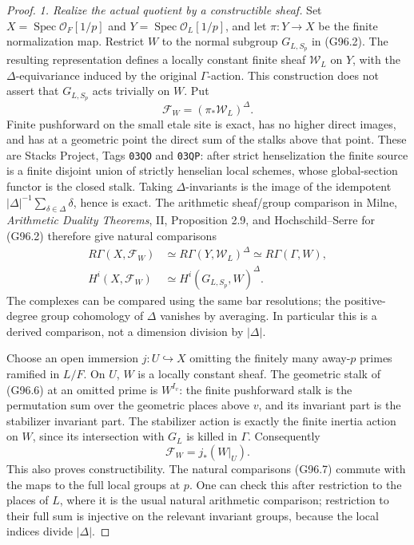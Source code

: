 \begin{proof}
\emph{1. Realize the actual quotient by a constructible sheaf.}
Set \(X=\operatorname{Spec}\mathcal O_F[1/p]\) and
\(Y=\operatorname{Spec}\mathcal O_L[1/p]\), and let
\(\pi:Y\to X\) be the finite normalization map.  Restrict \(W\)
to the normal subgroup \(G_{L,S_p}\) in (G96.2).  The resulting
representation defines a locally constant finite sheaf
\(\mathcal W_L\) on \(Y\), with the \(\Delta\)-equivariance
induced by the original \(\Gamma\)-action.  This construction
does not assert that \(G_{L,S_p}\) acts trivially on \(W\).
Put
\[
       \mathcal F_W=(\pi_*\mathcal W_L)^\Delta.
 \tag{G96.6}
\]
Finite pushforward on the small etale site is exact, has no
higher direct images, and has at a geometric point the direct sum
of the stalks above that point.  These are Stacks Project,
Tags \texttt{03QO} and \texttt{03QP}: after strict henselization
the finite source is a finite disjoint union of strictly henselian
local schemes, whose global-section functor is the closed stalk.
Taking \(\Delta\)-invariants is the image of the idempotent
\(|\Delta|^{-1}\sum_{\delta\in\Delta}\delta\), hence is exact.
The arithmetic sheaf/group comparison in Milne,
\emph{Arithmetic Duality Theorems}, II, Proposition 2.9, and
Hochschild--Serre for (G96.2) therefore give natural comparisons
\[
 \begin{split}
 R\Gamma(X,\mathcal F_W)
   &\simeq R\Gamma(Y,\mathcal W_L)^\Delta\simeq
     R\Gamma(\Gamma,W),\\
 H^i(X,\mathcal F_W)
   &\simeq H^i(G_{L,S_p},W)^\Delta.
 \end{split}
 \tag{G96.7}
\]
The complexes can be compared using the same bar resolutions;
the positive-degree group cohomology of \(\Delta\) vanishes by
averaging.  In particular this is a derived comparison, not a
dimension division by \(|\Delta|\).

Choose an open immersion \(j:U\hookrightarrow X\) omitting the
finitely many away-\(p\) primes ramified in \(L/F\).
On \(U\), \(W\) is a locally constant sheaf.  The geometric stalk
of (G96.6) at an omitted prime is \(W^{I_v}\): the finite
pushforward stalk is the permutation sum over the geometric
places above \(v\), and its invariant part is the stabilizer
invariant part.  The stabilizer action is exactly the finite
inertia action on \(W\), since its intersection with \(G_L\)
is killed in \(\Gamma\).  Consequently
\[
                   \mathcal F_W=j_*(W|_U).
 \tag{G96.8}
\]
This also proves constructibility.  The natural comparisons
(G96.7) commute with the maps to the full local groups at \(p\).
One can check this after restriction to the places of \(L\),
where it is the usual natural arithmetic comparison; restriction
to their full sum is injective on the relevant invariant groups,
because the local indices divide \(|\Delta|\).


\end{proof}
